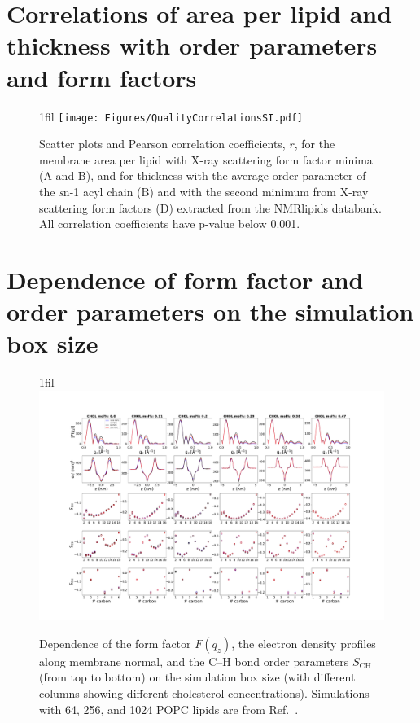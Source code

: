 \documentclass[fleqn,10pt]{wlscirepSI}
\makeatletter
\newcommand*{\centerfloat}{%
  \parindent \z@
  \leftskip \z@ \@plus 1fil \@minus \textwidth
  \rightskip\leftskip
  \parfillskip \z@skip}
\makeatother
\begin{document}
\pagebreak
\section*{Correlations of area per lipid and thickness with order parameters and form factors}

\begin{figure}[!h]
    \centerfloat
    \texttt{[image: Figures/QualityCorrelationsSI.pdf]}
    \caption{Scatter plots and Pearson correlation coefficients, $r$, for the membrane area per lipid with X-ray scattering form factor minima (A and B), and for thickness with the average order parameter of the {\textit sn}-1 acyl chain (B) and with the second minimum from X-ray scattering form factors (D) extracted from the NMRlipids databank. All correlation coefficients have p-value below 0.001.}
    \label{fig:QualityCorrelationsSI}
\end{figure}


\pagebreak
\section*{Dependence of form factor and order parameters on the simulation box size}

\begin{figure}[!h]
    \centerfloat
    \includegraphics[width = 240mm]{Figures/SizeDependence.pdf}
    \caption{Dependence of the form factor $F(q_z)$, the electron density profiles along membrane normal, and the C--H bond order parameters $S_\mathrm{CH}$ (from top to bottom) on the simulation box size (with different columns showing different cholesterol concentrations). Simulations with 64, 256, and 1024 POPC lipids are from Ref.~. }
    \label{fig:sizedependence}
\end{figure}
\end{document}
